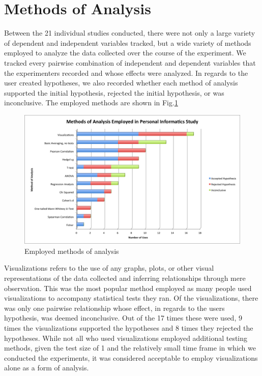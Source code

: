 \section{Methods of Analysis}
Between the 21 individual studies conducted, there were not only a large variety of dependent and independent variables tracked, but a wide variety of methods employed to analyze the data collected over the course of the experiment.  We tracked every pairwise combination of independent and dependent variables that the experimenters recorded and whose effects were analyzed.  In regards to the user created hypotheses, we also recorded whether each method of analysis supported the initial hypothesis, rejected the initial hypothesis, or was inconclusive.  The employed methods are shown in Fig.\ref{fig:analysis}

\begin{figure}[!t]\centering
\includegraphics[width=1.0\columnwidth]{images/Methods_of_Analysis.png}
\caption{\footnotesize Employed methods of analysis \label{fig:analysis} 
}%
\end{figure}


Visualizations refers to the use of any graphs, plots, or other visual representations of the data collected and inferring relationships through mere observation.  This was the most popular method employed as many people used visualizations to accompany statistical tests they ran.  Of the visualizations, there was only one pairwise relationship whose effect, in regards to the user\textquotesingle s hypothesis, was deemed inconclusive.  Out of the 17 times these were used, 9 times the visualizations supported the hypotheses and 8 times they rejected the hypotheses.  While not all who used visualizations employed additional testing methods, given the test size of 1 and the relatively small time frame in which we conducted the experiments, it was considered acceptable to employ visualizations alone as a form of analysis. 

